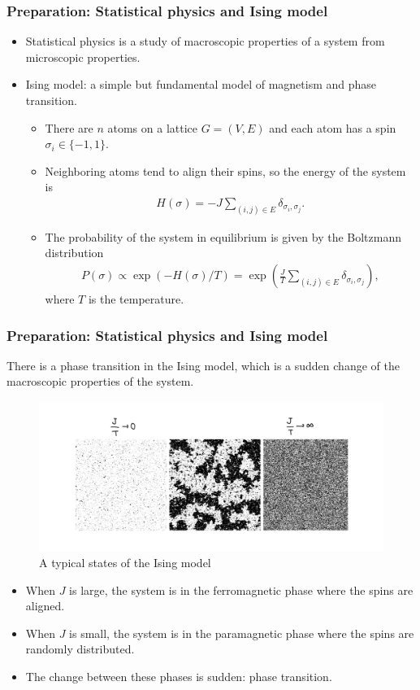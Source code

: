 \documentclass[dvipdfmx,11pt]{beamer}
\begin{document}
\begin{frame}
  \frametitle{Preparation: Statistical physics and Ising model}
  \begin{itemize}
    \item Statistical physics is a study of macroscopic properties of a system from microscopic properties.
    \item \alert{Ising model}: a simple but fundamental model of magnetism and phase transition.
    \begin{itemize}
      \item There are $n$ atoms on a lattice $G = (V, E)$ and each atom has a spin $\sigma_i \in \{-1, 1\}$.
      \item Neighboring atoms tend to align their spins, so the energy of the system is
      \begin{align*}
        H(\sigma) = - J \sum_{(i, j) \in E}  \delta_{\sigma_i, \sigma_j}.
      \end{align*}
      \item The probability of the system in equilibrium is given by the Boltzmann distribution
      \begin{align*}
        P(\sigma) \propto \exp(- H(\sigma) / T) = \exp( \frac{J}{T} \sum_{(i, j) \in E}  \delta_{\sigma_i, \sigma_j}),
      \end{align*}
      where $T$ is the temperature.
    \end{itemize}
  \end{itemize}
\end{frame}

\begin{frame}
  \frametitle{Preparation: Statistical physics and Ising model}
  There is a \alert{phase transition} in the Ising model, which is a sudden change of the macroscopic properties of the system.
  \begin{figure}
    \centering
    \includegraphics[width=0.6\linewidth]{figure/ising.jpeg}
    \caption{A typical states of the Ising model}
  \end{figure}
  \begin{itemize}
    \item When $J$ is large, the system is in the \alert{ferromagnetic phase} where the spins are aligned.
    \item When $J$ is small, the system is in the \alert{paramagnetic phase} where the spins are randomly distributed.
    \item The change between these phases is sudden: \alert{phase transition}.
  \end{itemize}
  
\end{frame}
\end{document}
